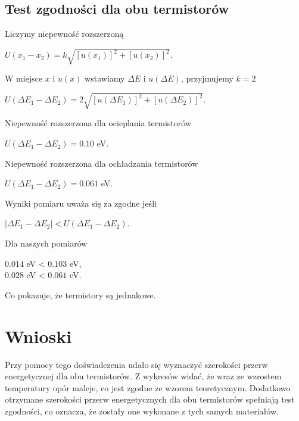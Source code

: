 \documentclass[12pt]{article}
\begin{document}
\subsection*{Test zgodności dla obu termistorów}
Liczymy niepewność rozszerzoną
\begin{center}
    $U(x_1 - x_2) = k\sqrt{[u(x_1)]^2+[u(x_2)]^2}$.
\end{center}
W miejsce $x$ i $u(x)$ wstawiamy $\Delta E$ i $u(\Delta E)$,
przyjmujemy $k = 2$
\begin{center}
    $U(\Delta E_1 - \Delta E_2) = 2\sqrt{[u(\Delta E_1)]^2+[u(\Delta E_2)]^2}$. \\
\end{center}
Niepewność rozszerzona dla ocieplania termistorów
\begin{center}
    $U(\Delta E_1 - \Delta E_2) = 0.10$ eV.
\end{center}
Niepewność rozszerzona dla ochładzania termistorów
\begin{center}
    $U(\Delta E_1 - \Delta E_2) = 0.061$ eV.
\end{center}
Wyniki pomiaru uważa się za zgodne jeśli
\begin{center}
    $|\Delta E_1 - \Delta E_2| < U(\Delta E_1 - \Delta E_2)$.
\end{center}
Dla naszych pomiarów
\begin{center}
    $0.014$ eV < $0.103$ eV, \\
    $0.028$ eV < $0.061$ eV.
\end{center}
Co pokazuje, że termistory są jednakowe.

\section{Wnioski}
Przy pomocy tego doświadczenia udało się wyznaczyć
szerokości przerw energetycznej dla obu termistorów. Z wykresów
widać, że wraz ze wzrostem temperatury opór maleje, co jest zgodne
ze wzorem teoretycznym. Dodatkowo otrzymane szerokości przerw
energetycznych dla obu termistorów spełniają test zgodności, co
oznacza, że zostały one wykonane z tych samych materiałów.
\end{document}

